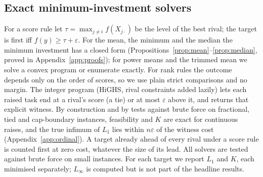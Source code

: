 \documentclass{article}
\begin{document}
\subsection{Exact minimum-investment solvers}
\label{sec:solvers}
For a score rule let $\tau=\max_{j\neq i} f(X_{j\cdot})$ be the level of the best rival; the target is first iff $f(y)\ge \tau+\varepsilon$. For the mean, the minimum and the median the minimum investment has a closed form (Propositions~\ref{prop:mean}--\ref{prop:median}, proved in Appendix~\ref{app:proofs}); for power means and the trimmed mean we solve a convex program or enumerate exactly. For rank rules the outcome depends only on the order of scores, so we use plain strict comparisons and no margin. The integer program (HiGHS, rival constraints added lazily) lets each raised task end at a rival's score (a tie) or at most $\varepsilon$ above it, and returns that explicit witness. By construction and by tests against brute force on fractional, tied and cap-boundary instances, feasibility and $K$ are exact for continuous raises, and the true infimum of $L_1$ lies within $n\varepsilon$ of the witness cost (Appendix~\ref{app:ordinal}). A target already ahead of every rival under a score rule is counted first at zero cost, whatever the size of its lead. All solvers are tested against brute force on small instances. For each target we report $L_1$ and $K$, each minimised separately; $L_\infty$ is computed but is not part of the headline results.
\end{document}
